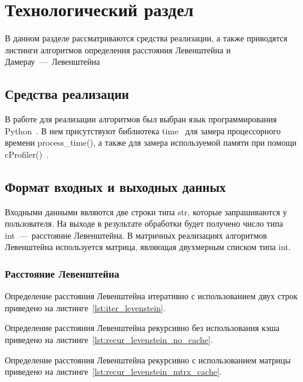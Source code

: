 \chapter{Технологический раздел}
В данном разделе рассматриваются средства реализации, а также приводятся листинги алгоритмов определения расстояния Левенштейна и Дамерау~---~Левенштейна

\section{Средства реализации}
В работе для реализации алгоритмов был выбран язык программирования Python~\cite{python}. В нем присутствуют библиотека time~\cite{process_time} для замера процессорного времени process\_time(), а также для замера используемой памяти при помощи cProfiler()~\cite{profiler}.

\section{Формат входных и выходных данных}
Входными данными являются две строки типа str, которые запрашиваются у пользователя. На выходе в результате обработки будет получено число типа int~---~расстояние Левенштейна. В матричных реализациях алгоритмов Левенштейна используется матрица, являющая двухмерным списком типа int.

\subsection{Расстояние Левенштейна}
Определение расстояния Левенштейна итеративно с использованием двух строк приведено на листинге~\ref{lst:iter_levenstein}.
\newpage


Определение расстояния Левенштейна рекурсивно без использования кэша приведено на листинге~\ref{lst:recur_levenstein_no_cache}.


Определение расстояния Левенштейна рекурсивно с использованием матрицы приведено на листинге~\ref{lst:recur_levenstein_mtrx_cache}.
\newpage


